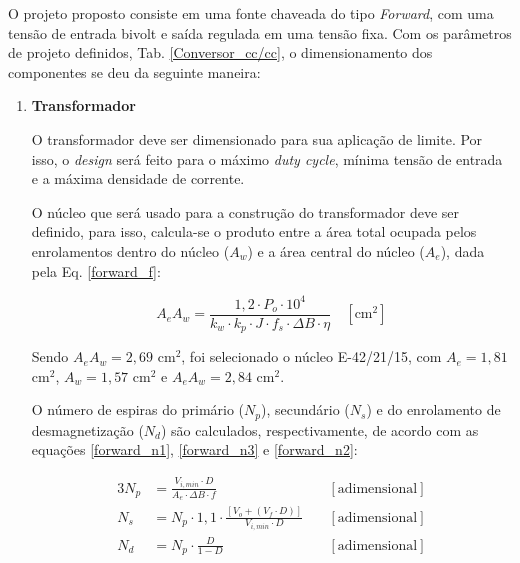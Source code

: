 \begin{apendicesenv}
O projeto proposto consiste em uma fonte chaveada do tipo \textit{Forward}, com uma tensão de entrada bivolt e saída regulada em uma tensão fixa. Com os parâmetros de projeto definidos, Tab. \ref{Conversor_cc/cc}, o dimensionamento dos componentes se deu da seguinte maneira:

\begin{enumerate}
    \item \textbf{Transformador}

O transformador deve ser dimensionado para sua aplicação de limite. Por isso, o \textit{design} será feito para o máximo \textit{duty cycle}, mínima tensão de entrada e a máxima densidade de corrente. 

O núcleo que será usado para a construção do transformador deve ser definido, para isso, calcula-se o produto entre a área total ocupada pelos enrolamentos dentro do núcleo ($A_{w}$) e a área central do núcleo ($A_{e}$), dada pela Eq. \ref{forward_f}:

    \begin{equation}
        A_{e} A_{w}= \frac{1,2 \cdot P_{o} \cdot 10^{4}}{k_{w} \cdot k_{p} \cdot J \cdot f_{s} \cdot \Delta B \cdot \eta} \quad [\text{cm}^2]
        \label{forward_f}
    \end{equation}

Sendo $A_{e} A_{w} = 2,69 $ cm$^{2}$, foi selecionado o núcleo E-42/21/15, com $A_{e} = 1,81$ cm$^{2}$, $A_{w} = 1,57 $ cm$^{2}$ e $A_{e} A_{w} = 2,84 $ cm$^{2}$. 

 O número de espiras do primário ($N_{p}$), secundário ($N_{s}$) e do enrolamento de desmagnetização ($N_{d}$) são calculados, respectivamente, de acordo com as equações \ref{forward_n1},  \ref{forward_n3} e \ref{forward_n2}:
    
    \begin{alignat}{3}
        N_{p} & = \frac{V_{i,min} \cdot D}{A_{e} \cdot \Delta B \cdot f} \quad & [\text{adimensional}]
        \label{forward_n1}\\
        N_{s} & = N_{p} \cdot 1,1 \cdot \frac{\left[ V_{o} + (V_{f} \cdot D) \right]}{V_{i,min} \cdot D} \quad & [\text{adimensional}]
        \label{forward_n2}\\
        N_{d} & = N_{p} \cdot \frac{D}{1-D} \quad & [\text{adimensional}]
        \label{forward_n3}
    \end{alignat}

    

\end{enumerate}
\end{apendicesenv}
